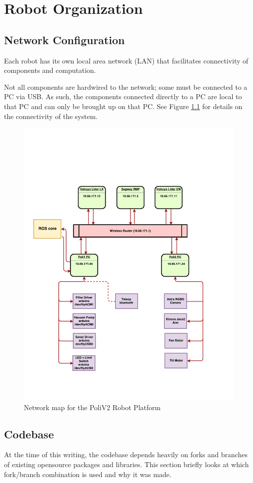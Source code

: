 \chapter{Robot Organization}\label{ch:robot_organization}

\section{Network Configuration}\label{sec:network_configuration}
Each robot has its own local area network (LAN) that facilitates connectivity of components and computation. 

Not all components are hardwired to the network; some must be connected to a PC via USB.
As such, the components connected directly to a PC are local to that PC and can only be brought up on that PC. See Figure \ref{fig:network_map} for details on the connectivity of the system.


\begin{figure}[]
\centering
\includegraphics[width=425px]{figures/network_diagram_cropped.pdf}
\caption{Network map for the PoliV2 Robot Platform}
\label{fig:network_map}
\end{figure}

\section{Codebase}
At the time of this writing, the codebase depends heavily on forks and branches of existing opensource packages and libraries. 
This section briefly looks at which fork/branch combination is used and why it was made. \\


